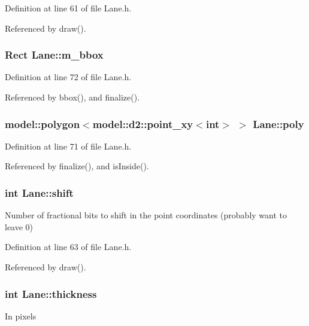 \-Definition at line 61 of file \-Lane.\-h.



\-Referenced by draw().

\hypertarget{class_lane_a00ae117899030b8d079edb4aba92f86c}{
\subsubsection[{m\-\_\-bbox}]{\setlength{\rightskip}{0pt plus 5cm}\-Rect {\bf \-Lane\-::m\-\_\-bbox}}}
\label{class_lane_a00ae117899030b8d079edb4aba92f86c}


\-Definition at line 72 of file \-Lane.\-h.



\-Referenced by bbox(), and finalize().

\hypertarget{class_lane_a8e0f8b6ff11437a3b16f8e030d1ea271}{
\subsubsection[{poly}]{\setlength{\rightskip}{0pt plus 5cm}model\-::polygon$<$model\-::d2\-::point\-\_\-xy$<$int$>$ $>$ {\bf \-Lane\-::poly}}}
\label{class_lane_a8e0f8b6ff11437a3b16f8e030d1ea271}


\-Definition at line 71 of file \-Lane.\-h.



\-Referenced by finalize(), and is\-Inside().

\hypertarget{class_lane_afd053ab5133d132146bef9f3c7afe92e}{
\subsubsection[{shift}]{\setlength{\rightskip}{0pt plus 5cm}int {\bf \-Lane\-::shift}}}
\label{class_lane_afd053ab5133d132146bef9f3c7afe92e}
\-Number of fractional bits to shift in the point coordinates (probably want to leave 0) 

\-Definition at line 63 of file \-Lane.\-h.



\-Referenced by draw().

\hypertarget{class_lane_aa614d556df980a9cf8974f77c69a1e10}{
\subsubsection[{thickness}]{\setlength{\rightskip}{0pt plus 5cm}int {\bf \-Lane\-::thickness}}}
\label{class_lane_aa614d556df980a9cf8974f77c69a1e10}
\-In pixels 


